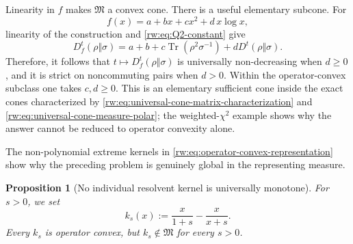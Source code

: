 \documentclass[11pt]{article}
\newtheorem{proposition}[proposition]{Proposition}
\theoremstyle{remark}
\newcommand{\1}{\mathbbm{1}}
\begin{document}
Linearity in $f$ makes $\mathfrak M$ a convex cone.  There is a useful
elementary subcone.  For
\begin{equation}
 f(x)=a+bx+cx^2+d\,x\log x,
 \label{rw:eq:elementary-monotone-cone}
\end{equation}
linearity of the construction and \eqref{rw:eq:Q2-constant} give
\begin{equation}
 D_f^t(\rho\Vert\sigma)
 =a+b+c\operatorname{Tr}(\rho^2\sigma^{-1})
  +dD^t(\rho\Vert\sigma).
 \label{rw:eq:elementary-monotone-cone-value}
\end{equation}
Therefore, it follows that $t\mapsto D_f^t(\rho\Vert\sigma)$ is universally
non-decreasing when $d\geq0$, and it is strict on noncommuting pairs
when $d>0$.
Within the operator-convex subclass one takes $c,d\geq0$.  This is an
elementary sufficient cone inside the exact cones characterized by
\eqref{rw:eq:universal-cone-matrix-characterization} and
\eqref{rw:eq:universal-cone-measure-polar}; the weighted-$\chi^2$
example shows why the answer cannot be reduced to operator convexity
alone.

The non-polynomial extreme kernels in
\eqref{rw:eq:operator-convex-representation} show why the preceding
problem is genuinely global in the representing measure.

\begin{proposition}[No individual resolvent kernel is universally
monotone]
\label{rw:prop:kernel-not-monotone}
For $s>0$, we set
\begin{equation}
 k_s(x):=\frac{x}{1+s}-\frac{x}{x+s}.
 \label{rw:eq:resolvent-kernel}
\end{equation}
Every $k_s$ is operator convex, but $k_s\notin\mathfrak M$ for
every $s>0$.
\end{proposition}
\end{document}
